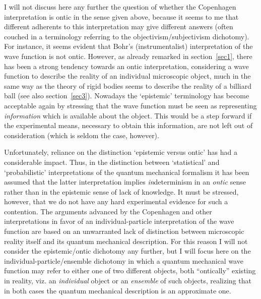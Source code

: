 \documentclass[12pt]{article}
\begin{document}
I will not discuss here any further the question of
whether the Copenhagen interpretation is ontic in the sense given
above, because it seems to me that different adherents to this
interpretation may give different answers (often couched in a
terminology referring to the objectivism/subjectivism dichotomy).
For instance, it seems evident that Bohr's (instrumentalist)
interpretation of the wave function is not ontic. However, as
already remarked in section~\ref{sec1}, there has been a strong
tendency towards an ontic interpretation, considering a wave
function to describe the reality of an individual microscopic
object, much in the same way as the theory of rigid bodies seems
to describe the reality of a billiard ball (see also
section~\ref{sec3}). Nowadays the `epistemic' terminology has
become acceptable again by stressing that the wave function must
be seen as representing {\em information} which is available about
the object. This would be a step forward if the experimental means,
necessary to obtain this information, are not left out of
consideration (which is seldom the case, however).

Unfortunately, reliance on the distinction `epistemic versus
ontic' has had a considerable impact. Thus, in the distinction
between `statistical' and `probabilistic' interpretations of the
quantum mechanical formalism it has been assumed that the latter
interpretation implies {\em in}determinism in an {\em ontic} sense
rather than in the epistemic sense of lack of knowledge. It must
be stressed, however, that we do not have any hard experimental
evidence for such a contention. The arguments advanced by the
Copenhagen and other interpretations in favor of an
individual-particle interpretation of the wave function are based
on an unwarranted lack of distinction between microscopic reality
itself and its quantum mechanical description. For this reason I
will not consider the epistemic/ontic dichotomy any further, but I
will focus here on the individual-particle/ensemble dichotomy in
which a quantum mechanical wave function may refer to either one
of two different objects, both ``ontically'' existing in reality,
viz. an {\em individual} object or an {\em ensemble} of such
objects, realizing that in both cases the quantum mechanical
description is an approximate one.
\end{document}
